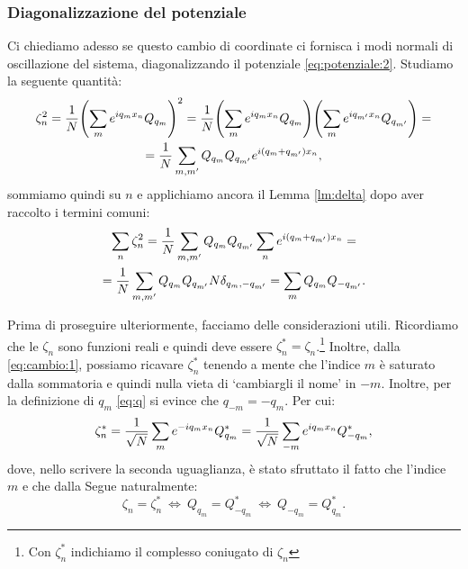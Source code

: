         \subsubsection{Diagonalizzazione del potenziale}
            Ci chiediamo adesso se questo cambio di coordinate ci fornisca i modi normali di oscillazione del sistema, diagonalizzando il potenziale \eqref{eq:potenziale:2}. Studiamo la seguente quantit\`a:
            \begin{multline*}
                \zeta_n^2=\frac{1}{N}\qty(\sum_me^{iq_mx_n}Q_{q_m})^2=\frac{1}{N}\qty(\sum_me^{iq_mx_n}Q_{q_m})\Biggl(\sum_{m} e^{iq_{m'}x_n}Q_{q_{m'}}\Biggr)=\\=\frac{1}{N}\sum_{m,m'}Q_{q_m}Q_{q_{m'}}e^{i\qty(q_m+q_{m'})x_n},
            \end{multline*}
            sommiamo quindi su $n$ e applichiamo ancora il Lemma \ref{lm:delta} dopo aver raccolto i termini comuni:
            \begin{multline*}
                \sum_n\zeta_n^2=\frac{1}{N}\sum_{m,m'}Q_{q_m}Q_{q_{m'}}\sum_ne^{i\qty(q_m+q_{m'})x_n}=\\=\frac{1}{N}\sum_{m,m'}Q_{q_m}Q_{q_{m'}}N\delta_{q_m,-q_{m'}}=\sum_mQ_{q_m}Q_{-q_{m'}}.
            \end{multline*}
            \par Prima di proseguire ulteriormente, facciamo delle considerazioni utili. Ricordiamo che le $\zeta_n$ sono funzioni reali e quindi deve essere $\zeta_n^*=\zeta_n$.\footnote{Con $\zeta_n^*$ indichiamo il complesso coniugato di $\zeta_n$} Inoltre, dalla \eqref{eq:cambio:1}, possiamo ricavare $\zeta_n^*$ tenendo a mente che l'indice $m$ \`e saturato dalla sommatoria e quindi nulla vieta di `cambiargli il nome' in $-m$. Inoltre, per la definizione di $q_m$ \eqref{eq:q} si evince che $q_{-m}=-q_m$. Per cui:
                $$\zeta_n^*=\frac{1}{\sqrt{N}}\sum_me^{-iq_mx_n}Q_{q_m}^*=\frac{1}{\sqrt{N}}\sum_{-m}e^{iq_mx_n}Q_{-q_{m}}^*,$$
            dove, nello scrivere la seconda uguaglianza, \`e stato sfruttato il fatto che l'indice $m$ e che dalla Segue naturalmente:
            \begin{equation}
                \zeta_n=\zeta_n^*\ \iff\ Q_{q_m}=Q_{-{q_m}}^*\ \iff\ Q_{-{q_m}}=Q_{q_m}^*.
                \label{eq:QQ}
            \end{equation}
